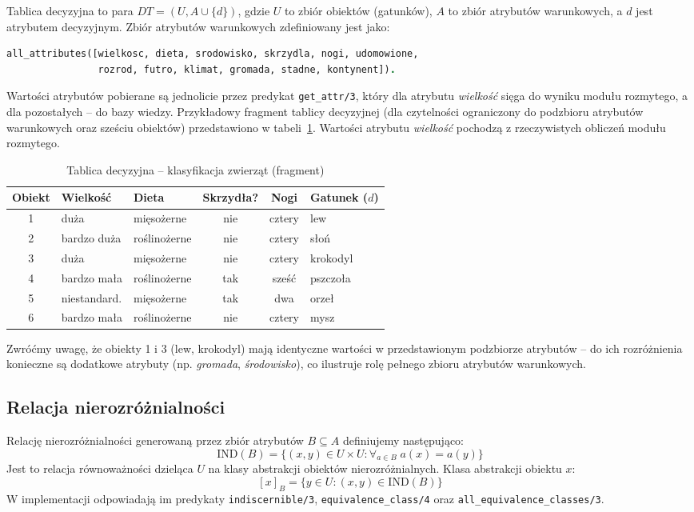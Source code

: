 \documentclass[11pt,a4paper]{article}
\newcommand{\code}[1]{\texttt{#1}}
\begin{document}
Tablica decyzyjna to para $DT=(U, A \cup \{d\})$, gdzie $U$ to zbiór obiektów
(gatunków), $A$ to zbiór atrybutów warunkowych, a $d$ jest atrybutem decyzyjnym.
Zbiór atrybutów warunkowych zdefiniowany jest jako:

\begin{lstlisting}[language=Prolog]
all_attributes([wielkosc, dieta, srodowisko, skrzydla, nogi, udomowione,
                rozrod, futro, klimat, gromada, stadne, kontynent]).
\end{lstlisting}

Wartości atrybutów pobierane są jednolicie przez predykat \code{get\_attr/3},
który dla atrybutu \textit{wielkość} sięga do wyniku modułu rozmytego, a dla
pozostałych -- do bazy wiedzy. Przykładowy fragment tablicy decyzyjnej (dla
czytelności ograniczony do podzbioru atrybutów warunkowych oraz sześciu
obiektów) przedstawiono w tabeli~\ref{tab:dt}. Wartości atrybutu
\textit{wielkość} pochodzą z rzeczywistych obliczeń modułu rozmytego.

\begin{table}[h]
\centering
\caption{Tablica decyzyjna -- klasyfikacja zwierząt (fragment)}
\label{tab:dt}
\small
\renewcommand{\arraystretch}{1.2}
\begin{tabular}{c l l c c l}
\toprule
\textbf{Obiekt} & \textbf{Wielkość} & \textbf{Dieta} & \textbf{Skrzydła?} & \textbf{Nogi} & \textbf{Gatunek ($d$)} \\
\midrule
1 & duża        & mięsożerne    & nie & cztery & lew \\
2 & bardzo duża & roślinożerne  & nie & cztery & słoń \\
3 & duża        & mięsożerne    & nie & cztery & krokodyl \\
4 & bardzo mała & roślinożerne  & tak & sześć  & pszczoła \\
5 & niestandard.& mięsożerne    & tak & dwa    & orzeł \\
6 & bardzo mała & roślinożerne  & nie & cztery & mysz \\
\bottomrule
\end{tabular}
\end{table}

Zwróćmy uwagę, że obiekty 1 i 3 (lew, krokodyl) mają identyczne wartości
w przedstawionym podzbiorze atrybutów -- do ich rozróżnienia konieczne są
dodatkowe atrybuty (np. \textit{gromada}, \textit{środowisko}), co ilustruje
rolę pełnego zbioru atrybutów warunkowych.

\subsection{Relacja nierozróżnialności}
Relację nierozróżnialności generowaną przez zbiór atrybutów $B \subseteq A$
definiujemy następująco:
\[
\mathrm{IND}(B) = \{(x,y)\in U\times U : \forall_{a\in B}\; a(x)=a(y)\}
\]
Jest to relacja równoważności dzieląca $U$ na klasy abstrakcji obiektów
nierozróżnialnych. Klasa abstrakcji obiektu $x$:
\[
[x]_B = \{y\in U : (x,y)\in \mathrm{IND}(B)\}
\]
W implementacji odpowiadają im predykaty \code{indiscernible/3},
\code{equivalence\_class/4} oraz
\code{all\_\allowbreak equivalence\_\allowbreak classes/3}.
\end{document}
